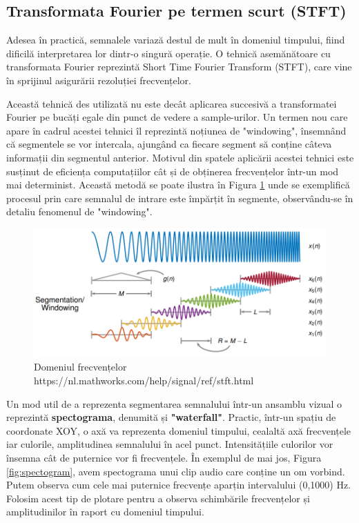 \documentclass[a4paper,12pt]{report}
\begin{document}
	\newpage
	\subsection{Transformata Fourier pe termen scurt (STFT)}
	Adesea în practică, semnalele variază destul de mult în domeniul timpului, fiind dificilă interpretarea lor dintr-o singură operație. O tehnică asemănătoare cu transformata Fourier reprezintă Short Time Fourier Transform (STFT), care vine în sprijinul asigurării rezoluției frecvențelor. 
	
	Această tehnică des utilizată nu este decât aplicarea succesivă a transformatei Fourier pe bucăți egale din punct de vedere a sample-urilor. Un termen nou care apare în cadrul acestei tehnici îl reprezintă noțiunea de "windowing", însemnând că segmentele se vor intercala, ajungând ca fiecare segment să conține câteva informații din segmentul anterior. Motivul din spatele aplicării acestei tehnici este susținut de eficiența computațiilor cât și de obținerea frecvențelor într-un mod mai determinist. Această metodă se poate ilustra în Figura \ref{fig:windowing} unde se exemplifică procesul prin care semnalul de intrare este împărțit în segmente, observându-se în detaliu fenomenul de "windowing".
	
	\begin{figure}[H]
		\includegraphics[width=\linewidth]{images/windowing.PNG}	
		\caption{Domeniul frecvențelor \newline
			\hspace{\linewidth}https://nl.mathworks.com/help/signal/ref/stft.html}
		\label{fig:windowing}
	\end{figure}
	
	Un mod util de a reprezenta segmentarea semnalului într-un ansamblu vizual o reprezintă \textbf{spectograma}, denumită și \textbf{"waterfall"}. Practic, într-un spațiu de coordonate XOY, o axă va reprezenta domeniul timpului, cealaltă axă frecvențele iar culorile, amplitudinea semnalului în acel punct. Intensitățiile culorilor vor însemna cât de puternice vor fi frecvențele. În exemplul de mai jos, Figura \ref{fig:spectogram}, avem spectograma unui clip audio care conține un om vorbind. Putem observa cum cele mai puternice frecvențe aparțin intervalului (0,1000) Hz. Folosim acest tip de plotare pentru a observa schimbările frecvențelor și amplitudinilor în raport cu domeniul timpului.
	
\end{document}
